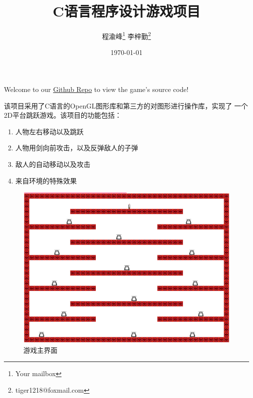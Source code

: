 \documentclass{beamer}
\title{C语言程序设计游戏项目}
\author{程渝峰\thanks{Your mailbox} 李梓勤\thanks{tiger1218@foxmail.com}}
\institute{四川大学网络空间安全学院}
\date{\today}
\begin{document}
\begin{frame}
    \titlepage
\end{frame}

\begin{frame}
    \centering
    \Large Welcome to our \href{https://github.com/SCUGamers/Murderer}{Github Repo} to view the game's source code!
\end{frame}

\begin{frame}
    该项目采用了C语言的OpenGL图形库和第三方的对图形进行操作库，实现了 一个2D平台跳跃游戏。该项目的功能包括：
    \begin{enumerate}
        \item 人物左右移动以及跳跃
        \item 人物用剑向前攻击，以及反弹敌人的子弹
        \item 敌人的自动移动以及攻击
        \item 来自环境的特殊效果
    \end{enumerate}

\end{frame}

\begin{frame}
    \begin{figure}[h]
        \centering
        \includegraphics[width=1\textwidth]{img/main_interface}
        \caption{游戏主界面}
    \end{figure}
\end{frame}
\end{document}
